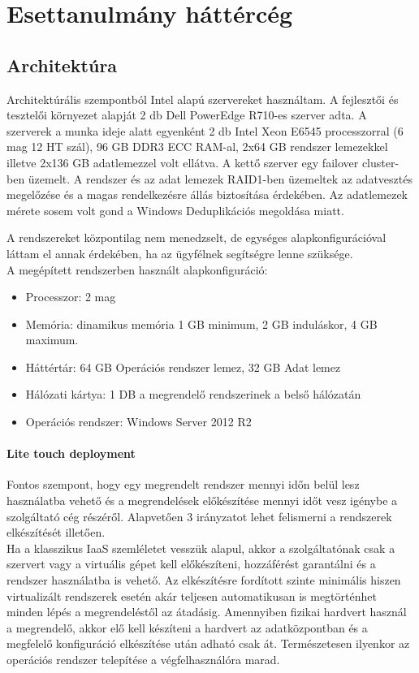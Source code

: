 \documentclass[12pt,oneside,justify,table]{book}
\begin{document}
\chapter{Esettanulmány háttércég}

\section{Architektúra}

Architektúrális szempontból Intel alapú szervereket használtam. A fejlesztői és tesztelői környezet alapját 2 db Dell PowerEdge R710-es szerver adta. A szerverek a munka ideje alatt egyenként 2 db Intel Xeon E6545 processzorral (6 mag 12 HT szál), 96 GB DDR3 ECC RAM-al, 2x64 GB rendszer lemezekkel illetve 2x136 GB adatlemezzel volt ellátva. A kettő szerver egy failover cluster-ben üzemelt. A rendszer és az adat lemezek RAID1-ben üzemeltek az adatvesztés megelőzése és a magas rendelkezésre állás biztosítása érdekében. Az adatlemezek mérete sosem volt gond a Windows Deduplikációs megoldása miatt.

A rendszereket központilag nem menedzselt, de egységes alapkonfigurációval láttam el annak érdekében, ha az ügyfélnek segítségre lenne szüksége. \\

\noindent A megépített rendszerben használt alapkonfiguráció:
\begin{itemize}
	\item Processzor: 2 mag
	\item Memória: dinamikus memória 1 GB minimum, 2 GB induláskor, 4 GB maximum.
	\item Háttértár: 64 GB Operációs rendszer lemez, 32 GB Adat lemez
	\item Hálózati kártya: 1 DB a megrendelő rendszerinek a belső hálózatán
	\item Operációs rendszer: Windows Server 2012 R2
\end{itemize}

\subsubsection{Lite touch deployment}
Fontos szempont, hogy egy megrendelt rendszer mennyi időn belül lesz használatba vehető és a megrendelések előkészítése mennyi időt vesz igénybe a szolgáltató cég részéről. Alapvetően 3 irányzatot lehet felismerni a rendszerek elkészítését illetően.\\

Ha a klasszikus IaaS szemléletet vesszük alapul, akkor a szolgáltatónak csak a szervert vagy a virtuális gépet kell előkészíteni, hozzáférést garantálni és a rendszer használatba is vehető. Az elkészítésre fordított szinte minimális hiszen virtualizált rendszerek esetén akár teljesen automatikusan is megtörténhet minden lépés a megrendeléstől az átadásig. Amennyiben fizikai hardvert használ a megrendelő, akkor elő kell készíteni a hardvert az adatközpontban és a megfelelő konfiguráció elkészítése után adható csak át. Természetesen ilyenkor az operációs rendszer telepítése a végfelhasználóra marad. \\
\end{document}

